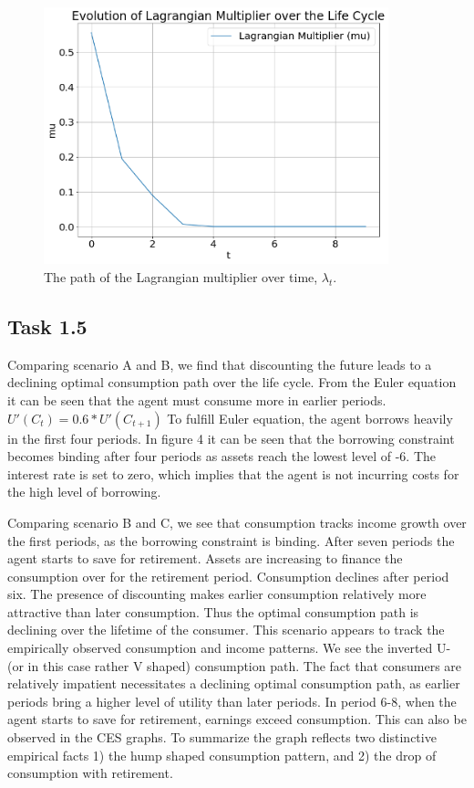 \documentclass[a4paper, 12pt]{article}
\begin{document}
\begin{figure}[H]
    \centering
    \includegraphics[width = 10cm]{task_1_4.png}
    \caption{The path of the Lagrangian multiplier over time, $\lambda_t$.}
    \label{fig:graph14}
\end{figure}

\subsection*{Task 1.5}

Comparing scenario A and B, we find that discounting the future leads to a declining optimal consumption path over the life cycle. From the Euler equation it can be seen that the agent must consume more in earlier periods. $U'(C_{t}) = 0.6*U'(C_{t+1})$ To fulfill Euler equation, the agent borrows heavily in the first four periods. In figure 4 it can be seen that the borrowing constraint becomes binding after four periods as assets reach the lowest level of -6. The interest rate is set to zero, which implies that the agent is not incurring costs for the high level of borrowing.

Comparing scenario B and C, we see that consumption tracks income growth over the first periods, as the borrowing constraint is binding. After seven periods the agent starts to save for retirement. Assets are increasing to finance the consumption over for the retirement period. Consumption declines after period six. The presence of discounting makes earlier consumption relatively more attractive than later consumption. Thus the optimal consumption path is declining over the lifetime of the consumer.   
This scenario appears to track the empirically observed consumption and income patterns. We see the inverted U- (or in this case rather V shaped) consumption path. The fact that consumers are relatively impatient necessitates a declining optimal consumption path, as earlier periods bring a higher level of utility than later periods. In period 6-8, when the agent starts to save for retirement, earnings exceed consumption. This can also be observed in the CES graphs. To summarize the graph reflects two distinctive empirical facts 1) the hump shaped consumption pattern, and 2) the drop of consumption with retirement. 
\end{document}
